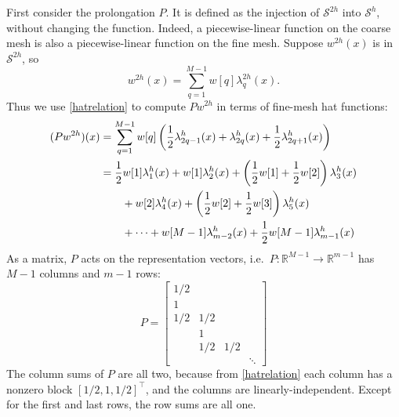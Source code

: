 \documentclass[letterpaper,final,12pt,reqno]{amsart}
\newcommand{\RR}{\mathbb{R}}
\begin{document}
First consider the prolongation $P$.  It is defined as the injection of $\mathcal{S}^{2h}$ into $\mathcal{S}^h$, without changing the function.  Indeed, a piecewise-linear function on the coarse mesh is also a piecewise-linear function on the fine mesh.  Suppose $w^{2h}(x)$ is in $\mathcal{S}^{2h}$, so
    $$w^{2h}(x) = \sum_{q=1}^{M-1} w[q] \lambda_q^{2h}(x).$$
Thus we use \eqref{hatrelation} to compute $P w^{2h}$ in terms of fine-mesh hat functions:
\begin{align}
(P w^{2h})(x) &= \sum_{q=1}^{M-1} w[q] \left(\frac{1}{2} \lambda_{2q-1}^h(x) + \lambda_{2q}^h(x) + \frac{1}{2} \lambda_{2q+1}^h(x)\right) \label{pformula} \\
              &= \frac{1}{2} w[1] \lambda_1^h(x) + w[1] \lambda_2^h(x) + \left(\frac{1}{2} w[1] + \frac{1}{2} w[2]\right) \lambda_3^h(x) \notag \\
              &\qquad + w[2] \lambda_4^h(x) + \left(\frac{1}{2} w[2] + \frac{1}{2} w[3]\right) \lambda_5^h(x) \notag \\
              &\qquad + \dots + w[M-1] \lambda_{m-2}^h(x) + \frac{1}{2} w[M-1] \lambda_{m-1}^h(x) \notag
\end{align}
As a matrix, $P$ acts on the representation vectors, i.e.~$P:\RR^{M-1} \to \RR^{m-1}$ has $M-1$ columns and $m-1$ rows:
\begin{equation}
P = \begin{bmatrix}
1/2 & & & \\
1 & & & \\
1/2 & 1/2 & & \\
 & 1 & & \\
 & 1/2 & 1/2 & \\
 & & & \ddots
\end{bmatrix} \label{pmatrix}
\end{equation}
The column sums of $P$ are all two, because from \eqref{hatrelation} each column has a nonzero block $[1/2,1,1/2]^\top$, and the columns are linearly-independent.  Except for the first and last rows, the row sums are all one.
\end{document}
